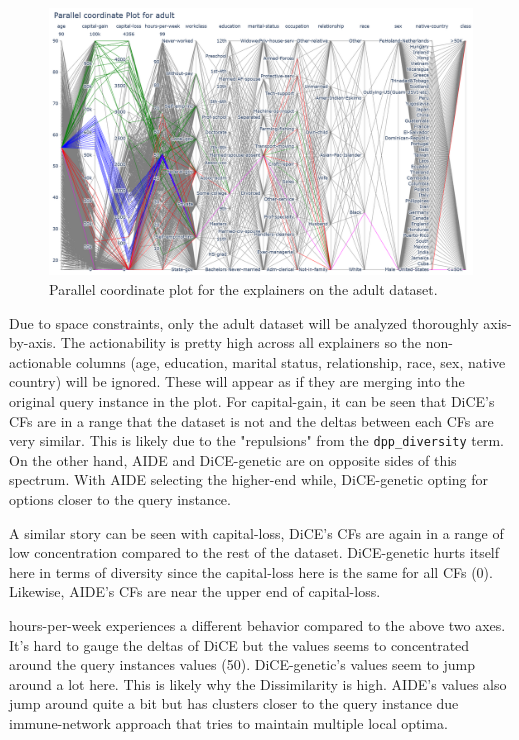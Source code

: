 \begin{figure}[!htbp]
    \centering
    \includegraphics[width=\textwidth]{images/pcp-adult.png}
    \caption{Parallel coordinate plot for the explainers on the adult dataset.}
    \label{fig:pcp-adult}
\end{figure}

Due to space constraints, only the adult dataset will be analyzed thoroughly axis-by-axis. The actionability is pretty high across all explainers so the non-actionable columns (age, education, marital status, relationship, race, sex, native country) will be ignored. These will appear as if they are merging into the original query instance in the plot. For capital-gain, it can be seen that DiCE's CFs are in a range that the dataset is not and the deltas between each CFs are very similar. This is likely due to the "repulsions" from the \verb|dpp_diversity| term. On the other hand, AIDE and DiCE-genetic are on opposite sides of this spectrum. With AIDE selecting the higher-end while, DiCE-genetic opting for options closer to the query instance. 

A similar story can be seen with capital-loss, DiCE's CFs are again in a range of low concentration compared to the rest of the dataset. DiCE-genetic hurts itself here in terms of diversity since the capital-loss here is the same for all CFs (0). Likewise, AIDE's CFs are near the upper end of capital-loss.

hours-per-week experiences a different behavior compared to the above two axes. It's hard to gauge the deltas of DiCE but the values seems to concentrated around the query instances values (50). DiCE-genetic's values seem to jump around a lot here. This is likely why the  Dissimilarity is high. AIDE's values also jump around quite a bit but has clusters closer to the query instance due immune-network approach that tries to maintain multiple local optima.

